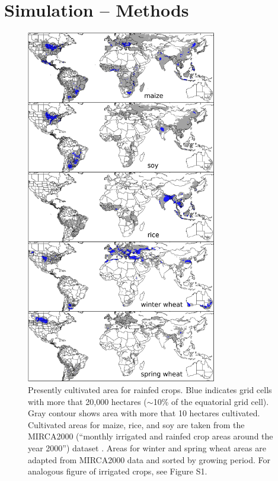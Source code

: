 \documentclass[esd, manuscript]{copernicus} %
\begin{document}
\section{Simulation -- Methods}
\label{S:2}

\begin{figure}[ht]
\centering
   \includegraphics[width=8.3cm]{figures/croparea.png}
   \caption{Presently cultivated area for rainfed crops. Blue indicates grid cells with more that 20,000 hectares ($\sim$10\% of the equatorial grid cell). Gray contour shows area with more that 10 hectares cultivated. Cultivated areas for maize, rice, and soy are taken from the MIRCA2000 (``monthly irrigated and rainfed crop areas around the year 2000'') dataset \citep{Portmann2010}. Areas for winter and spring wheat areas are adapted from MIRCA2000 data and sorted by growing period. For analogous figure of irrigated crops, see Figure S1.}
   \label{fig:crop_area}
\end{figure}
\end{document}

